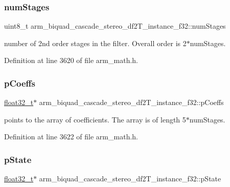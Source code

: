\subsubsection{\texorpdfstring{num\+Stages}{numStages}}
{\footnotesize\ttfamily uint8\+\_\+t arm\+\_\+biquad\+\_\+cascade\+\_\+stereo\+\_\+df2\+T\+\_\+instance\+\_\+f32\+::num\+Stages}

number of 2nd order stages in the filter. Overall order is 2$\ast$num\+Stages. 

Definition at line 3620 of file arm\+\_\+math.\+h.

\mbox{\label{structarm__biquad__cascade__stereo__df2_t__instance__f32_a58b15644de62a632c5e9d4a563569dc6}} 
\subsubsection{\texorpdfstring{p\+Coeffs}{pCoeffs}}
{\footnotesize\ttfamily \hyperlink{arm__math_8h_a4611b605e45ab401f02cab15c5e38715}{float32\+\_\+t}$\ast$ arm\+\_\+biquad\+\_\+cascade\+\_\+stereo\+\_\+df2\+T\+\_\+instance\+\_\+f32\+::p\+Coeffs}

points to the array of coefficients. The array is of length 5$\ast$num\+Stages. 

Definition at line 3622 of file arm\+\_\+math.\+h.

\mbox{\label{structarm__biquad__cascade__stereo__df2_t__instance__f32_a2cb00048bb1fe957a03c1ff56dfaf8f0}} 
\subsubsection{\texorpdfstring{p\+State}{pState}}
{\footnotesize\ttfamily \hyperlink{arm__math_8h_a4611b605e45ab401f02cab15c5e38715}{float32\+\_\+t}$\ast$ arm\+\_\+biquad\+\_\+cascade\+\_\+stereo\+\_\+df2\+T\+\_\+instance\+\_\+f32\+::p\+State}

